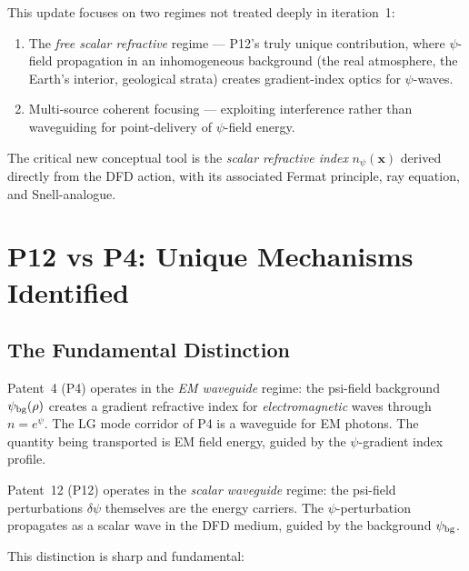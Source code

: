 \documentclass[aps,prd,twocolumn,superscriptaddress]{revtex4-2}
\newcommand{\npsi}{n_\psi}
\begin{document}
This update focuses on two regimes not treated deeply in iteration~1:
\begin{enumerate}
\item The \emph{free scalar refractive} regime --- P12's truly unique
contribution, where $\psi$-field propagation in an inhomogeneous
background (the real atmosphere, the Earth's interior, geological strata)
creates gradient-index optics for $\psi$-waves.
\item Multi-source coherent focusing --- exploiting interference rather
than waveguiding for point-delivery of $\psi$-field energy.
\end{enumerate}

The critical new conceptual tool is the \emph{scalar refractive index}
$\npsi(\mathbf{x})$ derived directly from the DFD action, with its
associated Fermat principle, ray equation, and Snell-analogue.

\section{P12 vs P4: Unique Mechanisms Identified}
\label{sec:p12vsp4}

\subsection{The Fundamental Distinction}

Patent~4 (P4) operates in the \emph{EM waveguide} regime: the psi-field
background $\psi_{\rm bg}(\rho)$ creates a gradient refractive index for
\emph{electromagnetic} waves through $n = e^\psi$.  The LG mode corridor
of P4 is a waveguide for EM photons.  The quantity being transported is
EM field energy, guided by the $\psi$-gradient index profile.

Patent~12 (P12) operates in the \emph{scalar waveguide} regime: the
psi-field perturbations $\delta\psi$ themselves are the energy carriers.
The $\psi$-perturbation propagates as a scalar wave in the DFD medium,
guided by the background $\psi_{\rm bg}$.

This distinction is sharp and fundamental:
\end{document}
